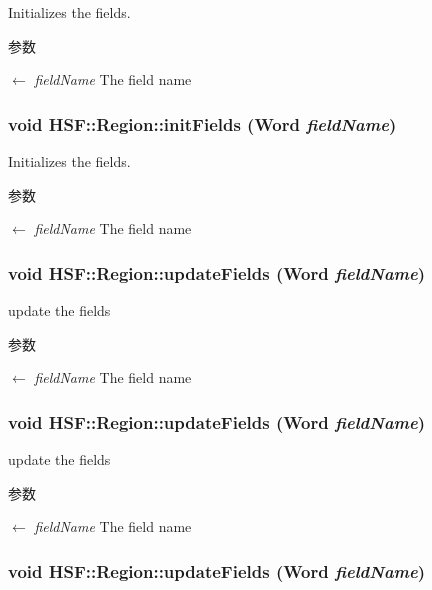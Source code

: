 Initializes the fields. 
\begin{DoxyParams}{参数}
\item[\mbox{$\leftarrow$} {\em fieldName}]The field name \end{DoxyParams}
\hypertarget{classHSF_1_1Region_a04109e318bad70575bf6aa0f810913bf}{
\subsubsection[{initFields}]{\setlength{\rightskip}{0pt plus 5cm}void HSF::Region::initFields (Word {\em fieldName})}}
\label{classHSF_1_1Region_a04109e318bad70575bf6aa0f810913bf}


Initializes the fields. 
\begin{DoxyParams}{参数}
\item[\mbox{$\leftarrow$} {\em fieldName}]The field name \end{DoxyParams}
\hypertarget{classHSF_1_1Region_a4a3da7e779636d389f013301006a02b4}{
\subsubsection[{updateFields}]{\setlength{\rightskip}{0pt plus 5cm}void HSF::Region::updateFields (Word {\em fieldName})}}
\label{classHSF_1_1Region_a4a3da7e779636d389f013301006a02b4}


update the fields 
\begin{DoxyParams}{参数}
\item[\mbox{$\leftarrow$} {\em fieldName}]The field name \end{DoxyParams}
\hypertarget{classHSF_1_1Region_a4a3da7e779636d389f013301006a02b4}{
\subsubsection[{updateFields}]{\setlength{\rightskip}{0pt plus 5cm}void HSF::Region::updateFields (Word {\em fieldName})}}
\label{classHSF_1_1Region_a4a3da7e779636d389f013301006a02b4}


update the fields 
\begin{DoxyParams}{参数}
\item[\mbox{$\leftarrow$} {\em fieldName}]The field name \end{DoxyParams}
\hypertarget{classHSF_1_1Region_a4a3da7e779636d389f013301006a02b4}{
\subsubsection[{updateFields}]{\setlength{\rightskip}{0pt plus 5cm}void HSF::Region::updateFields (Word {\em fieldName})}}
\label{classHSF_1_1Region_a4a3da7e779636d389f013301006a02b4}


